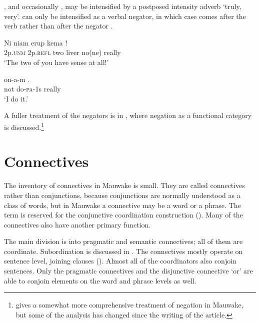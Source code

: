 \textstyleStyleVernacularWordsItalic{} ,  and occasionally  , may be intensified by a postposed intensity adverb  `truly, very'.  can only be intensified as a verbal negator, in which case  comes after the verb rather than after the negator  .

\ea%
\label{ex:3:x652}
\gll Ni niam erup kema  ! \\
2p.\textsc{unm} 2p.\textsc{refl} two liver no(ne) really\\
\glt`The two of you have  sense at all!'
\z

\ea%
\label{ex:3:x653}
\gll {} on-a-m . \\
not do-\textsc{pa}-1s really\\
\glt`I  do it.'
\z

A fuller treatment of the negators is in , where negation as a functional category is discussed.\footnote{\citet{Berghall2006} gives a somewhat more comprehensive treatment of negation in Mauwake, but some of the analysis has changed since the writing of the article.}

\section{Connectives}\label{sec:3:11}
{}
The inventory of connectives in Mauwake is small. They are called connectives rather than conjunctions, because conjunctions are normally understood as a class of words, but in Mauwake a connective may be a word or a phrase. The term  is reserved for the conjunctive coordination construction (). Many of the connectives also have another primary function. 

The main division is into pragmatic and semantic connectives; all of them are coordinate. Subordination is discussed in . The connectives mostly operate on sentence level, joining clauses (). Almost all of the coordinators also conjoin sentences. Only the pragmatic connectives and the disjunctive connective  `or' are able to conjoin elements on the word and phrase levels as well. 

